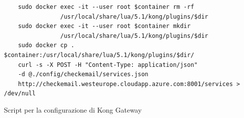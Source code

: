 \begin{algorithm}
\centering
\begin{verbatim}
    sudo docker exec -it --user root $container rm -rf 
				/usr/local/share/lua/5.1/kong/plugins/$dir
    sudo docker exec -it --user root $container mkdir
				/usr/local/share/lua/5.1/kong/plugins/$dir
    sudo docker cp . $container:/usr/local/share/lua/5.1/kong/plugins/$dir/
    curl -s -X POST -H "Content-Type: application/json"
	-d @./config/checkemail/services.json
	http://checkemail.westeurope.cloudapp.azure.com:8001/services > /dev/null
\end{verbatim}
\caption{Script per la configurazione di Kong Gateway}\label{alg:container_config}
\end{algorithm}

